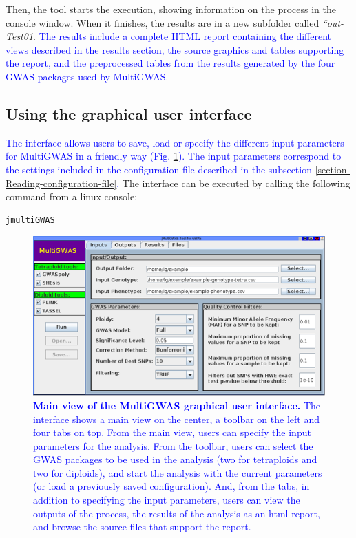 \documentclass{article}
\begin{document}
Then, the tool starts the execution, showing information on the process in the console window. When it finishes, the results are in a new subfolder called \emph{``out-Test01}. \textcolor{blue}{{} The results include a complete HTML report containing the different views described in the results section, the source graphics and tables supporting the report, and the preprocessed tables from the results generated by the four GWAS packages used by MultiGWAS.}



\subsection{Using the graphical user interface}
\textcolor{blue}{The interface allows users to save, load or specify the different input parameters for MultiGWAS in a friendly way (Fig. \ref{fig:MultiGWAS-interaction}). The input parameters correspond to the settings included in the configuration file described in the subsection \ref{section-Reading-configuration-file}.} The interface can be executed by calling the following command from a linux console:

\begin{lstlisting}[language=bash,basicstyle={\small}]
jmultiGWAS
\end{lstlisting}

\begin{figure}[H]
\begin{centering}
\includegraphics[scale=0.5]{images/paper-implementation-jmultiGWAS}
\par\end{centering}
\caption{\textbf{\textcolor{blue}{Main view of the MultiGWAS graphical user interface.}}\textcolor{blue}{{} The interface shows a main view on the center, a toolbar on the left and four tabs on top. From the main view, users can specify the input parameters for the analysis. From the toolbar, users can select the GWAS packages to be used in the analysis (two for tetraploids and two for diploids), and start the analysis with the current parameters (or load a previously saved configuration). And, from the tabs, in addition to specifying the input parameters, users can view the outputs of the process, the results of the analysis as an html report, and browse the source files that support the report.}\label{fig:MultiGWAS-interaction} }
\end{figure}
\end{document}
